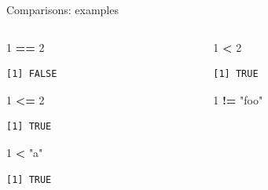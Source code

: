 \documentclass[
  11pt,
  ignorenonframetext,
]{beamer}
\newenvironment{Shaded}{\begin{snugshade}}{\end{snugshade}}
\newcommand{\DecValTok}[1]{\textcolor[rgb]{0.00,0.00,0.81}{#1}}
\newcommand{\SpecialCharTok}[1]{\textcolor[rgb]{0.81,0.36,0.00}{\textbf{#1}}}
\newcommand{\StringTok}[1]{\textcolor[rgb]{0.31,0.60,0.02}{#1}}
\begin{document}
\begin{frame}[fragile]{Comparisons: examples}
\protect\hypertarget{comparisons-examples}{}
\begin{columns}[T,onlytextwidth]
\begin{column}{0.45\textwidth}
\begin{Shaded}
\begin{Highlighting}[]
\DecValTok{1} \SpecialCharTok{==} \DecValTok{2}
\end{Highlighting}
\end{Shaded}

\begin{verbatim}
[1] FALSE
\end{verbatim}

\begin{Shaded}
\begin{Highlighting}[]
\DecValTok{1} \SpecialCharTok{\textless{}=} \DecValTok{2}
\end{Highlighting}
\end{Shaded}

\begin{verbatim}
[1] TRUE
\end{verbatim}

\begin{Shaded}
\begin{Highlighting}[]
\DecValTok{1} \SpecialCharTok{\textless{}} \StringTok{"a"}
\end{Highlighting}
\end{Shaded}

\begin{verbatim}
[1] TRUE
\end{verbatim}
\end{column}

\begin{column}{0.45\textwidth}
\begin{Shaded}
\begin{Highlighting}[]
\DecValTok{1} \SpecialCharTok{\textless{}} \DecValTok{2}
\end{Highlighting}
\end{Shaded}

\begin{verbatim}
[1] TRUE
\end{verbatim}

\begin{Shaded}
\begin{Highlighting}[]
\DecValTok{1} \SpecialCharTok{!=} \StringTok{"foo"}
\end{Highlighting}
\end{Shaded}


\end{column}
\end{columns}
\end{frame}
\end{document}

